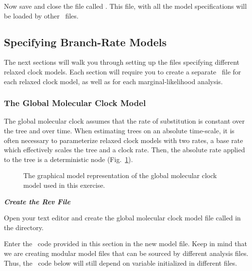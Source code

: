Now save and close the file called {\textcolor{red}{}}. This file, with all the model specifications will be loaded by other \Rev~files. 

\bigskip
\subsection{Specifying Branch-Rate Models}\label{brMods} 

The next sections will walk you through setting up the files specifying different relaxed clock models. 
Each section will require you to create a separate \Rev~file for each relaxed clock model, as well as for each marginal-likelihood analysis.

\bigskip
\subsubsection{The Global Molecular Clock Model}

The global molecular clock assumes that the rate of substitution is constant over the tree and over time.
When estimating trees on an absolute time-scale, it is often necessary to parameterize relaxed clock models with two rates, a base rate which effectively scales the tree and a clock rate. 
Then, the absolute rate applied to the tree is a deterministic node (Fig.~\ref{m_GMC:fig}).

\begin{figure}[h!]
\centering
{}
\caption{\small The graphical model representation of the global molecular clock model used in this exercise.}
\label{m_GMC:fig}
\end{figure}

\textbf{\textit{Create the Rev File}}

{\begin{framed}
Open your text editor and create the global molecular clock model file called {\textcolor{red}{}} in the  directory.

Enter the \Rev~code provided in this section in the new model file. Keep in mind that we are creating modular model files that can be sourced by different analysis files. Thus, the \Rev~code below will still depend on variable initialized in different files.
\end{framed}}




